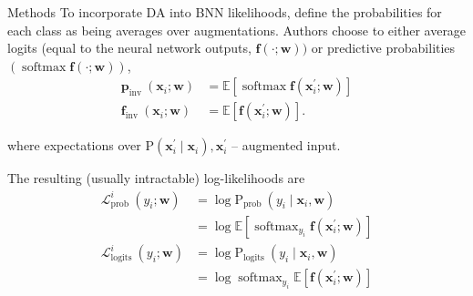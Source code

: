 \documentclass[10pt, handout, envcountsect]{beamer} %
\begin{document}
\begin{frame}{Methods}
To incorporate DA into BNN likelihoods, define the probabilities for each class as being averages over augmentations.
Authors choose to either average logits (equal to the neural network outputs, $\mathbf{f}(\cdot ; \mathbf{w}))$ or predictive probabilities $(\operatorname{softmax} \mathbf{f}(\cdot ; \mathbf{w}))$,
\begin{align*}
\mathbf{p}_{\text {inv }}\left(\mathbf{x}_{i} ; \mathbf{w}\right) & =\mathbb{E}\left[\operatorname{softmax} \mathbf{f}\left(\mathbf{x}_{i}^{\prime} ; \mathbf{w}\right)\right]  \tag{3}\\
\mathbf{f}_{\text {inv }}\left(\mathbf{x}_{i} ; \mathbf{w}\right) & =\mathbb{E}\left[\mathbf{f}\left(\mathbf{x}_{i}^{\prime} ; \mathbf{w}\right)\right] . \tag{4}
\end{align*}

where expectations over $\mathrm{P}\left(\mathbf{x}_{i}^{\prime} \mid \mathbf{x}_{i}\right), \mathbf{x}_{i}^{\prime}$ -- augmented input.

\vspace{8pt}

The resulting (usually intractable) log-likelihoods are
\begin{align*}
\mathcal{L}_{\text {prob }}^{i}\left(y_{i} ; \mathbf{w}\right) & =\log \mathrm{P}_{\text {prob }}\left(y_{i} \mid \mathbf{x}_{i}, \mathbf{w}\right) \\
& =\log \mathbb{E}\left[\operatorname{softmax}_{y_{i}} \mathbf{f}\left(\mathbf{x}_{i}^{\prime} ; \mathbf{w}\right)\right]  \tag{5}\\
\mathcal{L}_{\text {logits }}^{i}\left(y_{i} ; \mathbf{w}\right) & =\log \mathrm{P}_{\text {logits }}\left(y_{i} \mid \mathbf{x}_{i}, \mathbf{w}\right) \\
& =\log \operatorname{softmax}_{y_{i}} \mathbb{E}\left[\mathbf{f}\left(\mathbf{x}_{i}^{\prime} ; \mathbf{w}\right)\right] \tag{6}
\end{align*}





\end{frame}
\end{document}
